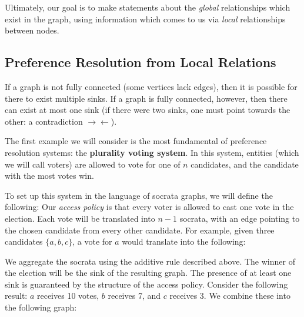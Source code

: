 
Ultimately, our goal is to make statements about the \textit{global} relationships which exist in the graph, using information which comes to us via \textit{local} relationships between nodes.

\subsection{Preference Resolution from Local Relations}

If a graph is not fully connected (some vertices lack edges), then it is possible for there to exist multiple sinks.
If a graph is fully connected, however, then there can exist at most one sink (if there were two sinks, one must point towards the other: a contradiction $\rightarrow\leftarrow$).

The first example we will consider is the most fundamental of preference resolution systems: the \textbf{plurality voting system}.
In this system, entities (which we will call voters) are allowed to vote for one of $n$ candidates, and the candidate with the most votes win.

To set up this system in the language of socrata graphs, we will define the following:
Our \textit{access policy} is that every voter is allowed to cast one vote in the election.
Each vote will be translated into $n-1$ socrata, with an edge pointing to the chosen candidate from every other candidate.
For example, given three candidates $\{a, b, c\}$, a vote for $a$ would translate into the following:

\begin{center}
	

	
\end{center}

We aggregate the socrata using the additive rule described above.
The winner of the election will be the sink of the resulting graph.
The presence of at least one sink is guaranteed by the structure of the access policy.
Consider the following result: $a$ receives 10 votes, $b$ receives 7, and $c$ receives 3.
We combine these into the following graph:

\begin{center}
\end{center}

